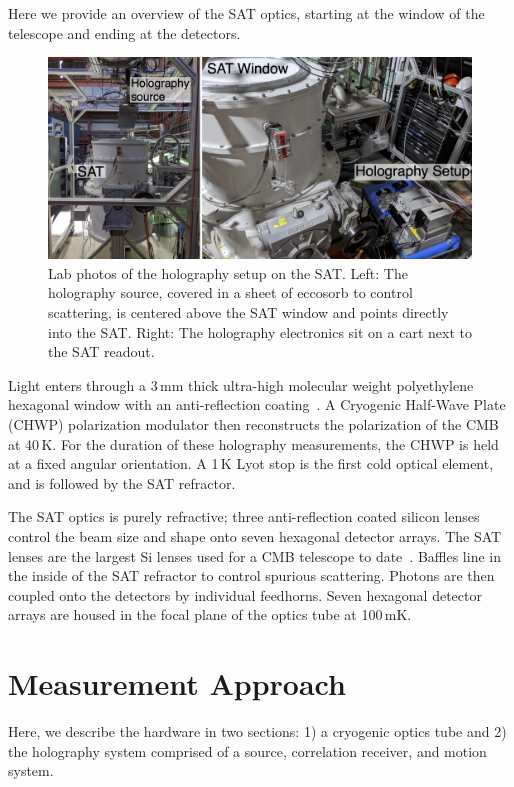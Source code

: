 Here we provide an overview of the SAT optics, starting at the window of the telescope and ending at the detectors.

\begin{figure}[t!]
    \centering
    \includegraphics[width = \textwidth]{Figures/sat_exp.png}
    \caption{Lab photos of the holography setup on the SAT.  Left: The holography source, covered in a sheet of eccosorb to control scattering, is centered above the SAT window and points directly into the SAT.  Right:  The holography electronics sit on a cart next to the SAT readout.}
    \label{fig:sat_hardware}
\end{figure}

Light enters through a 3\,mm thick ultra-high molecular weight polyethylene hexagonal window with an anti-reflection coating~\cite{zhu18}.  A Cryogenic Half-Wave Plate (CHWP) polarization modulator then reconstructs the polarization of the CMB at 40\,K.  For the duration of these holography measurements, the CHWP is held at a fixed angular orientation.  A 1\,K Lyot stop is the first cold optical element, and is followed by the SAT refractor.

The SAT optics is purely refractive; three anti-reflection coated silicon lenses~\cite{Datta:13,golec20} control the beam size and shape onto seven hexagonal detector arrays.  The SAT lenses are the largest Si lenses used for a CMB telescope to date~\cite{ali20}.  Baffles line in the inside of the SAT refractor to control spurious scattering.  Photons are then coupled onto the detectors by individual feedhorns. Seven hexagonal detector arrays are housed in the focal plane of the optics tube at 100\,mK.

\section{Measurement Approach}
\label{sec:satot_meas_method}
Here, we describe the hardware in two sections: 1) a cryogenic optics tube and 2) the holography system comprised of a source, correlation receiver, and motion system.
